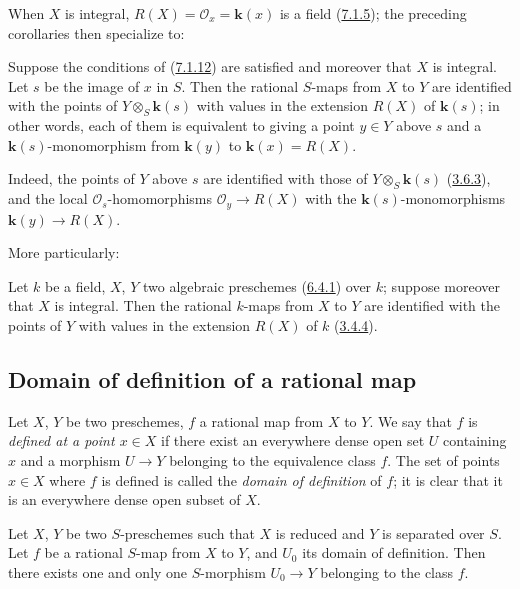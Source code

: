 When $X$ is integral, $R(X)=\mathscr{O}_x=\boldsymbol{k}(x)$ is a field
(\hyperref[I.7.1.5]{7.1.5}); the preceding corollaries then specialize
to:

\begin{corollary}[7.1.15]
\label{I.7.1.15}
Suppose the conditions of \textup{(\hyperref[I.7.1.12]{7.1.12})} are satisfied and
moreover that $X$ is integral. Let $s$ be the image of $x$ in $S$. Then the
rational $S$-maps from $X$ to $Y$ are identified with the points of
$Y\otimes_S \boldsymbol{k}(s)$ with values in the extension $R(X)$ of $\boldsymbol{k}(s)$; in other
words, each of them is equivalent to giving a point $y\in Y$ above $s$ and a
$\boldsymbol{k}(s)$-monomorphism from $\boldsymbol{k}(y)$ to
$\boldsymbol{k}(x)=R(X)$.
\end{corollary}

Indeed, the points of $Y$ above $s$ are identified with those of
$Y\otimes_S \boldsymbol{k}(s)$ (\hyperref[I.3.6.3]{3.6.3}), and the local
$\mathscr{O}_s$-homomorphisms $\mathscr{O}_y\to R(X)$ with the
$\boldsymbol{k}(s)$-monomorphisms $\boldsymbol{k}(y)\to R(X)$.

More particularly:

\begin{corollary}[7.1.16]
\label{I.7.1.16}
Let $k$ be a field, $X$, $Y$ two algebraic preschemes
\textup{(\hyperref[I.6.4.1]{6.4.1})} over $k$; suppose moreover that $X$ is
integral. Then the rational $k$-maps from $X$ to $Y$ are identified with the
points of $Y$ with values in the extension $R(X)$ of $k$
\textup{(\hyperref[I.3.4.4]{3.4.4})}.
\end{corollary}

\subsection{Domain of definition of a rational map}
\label{subsection:I.7.2}

\begin{env}[7.2.1]
\label{I.7.2.1}
Let $X$, $Y$ be two preschemes, $f$ a rational map from $X$ to $Y$. We say
that $f$ is \emph{defined at a point $x\in X$} if there exist an everywhere
dense open set $U$ containing $x$ and a morphism $U\to Y$ belonging to the
equivalence class $f$. The set of points $x\in X$ where $f$ is defined is
called the \emph{domain of definition} of $f$; it is clear that it is an
everywhere dense open subset of $X$.
\end{env}

\begin{proposition}[7.2.2]
\label{I.7.2.2}
Let $X$, $Y$ be two $S$-preschemes such that $X$ is reduced and $Y$ is
separated over $S$. Let $f$ be a rational $S$-map from $X$ to $Y$, and $U_0$
its domain of definition. Then there exists one and only one $S$-morphism
$U_0\to Y$ belonging to the class $f$.
\end{proposition}

